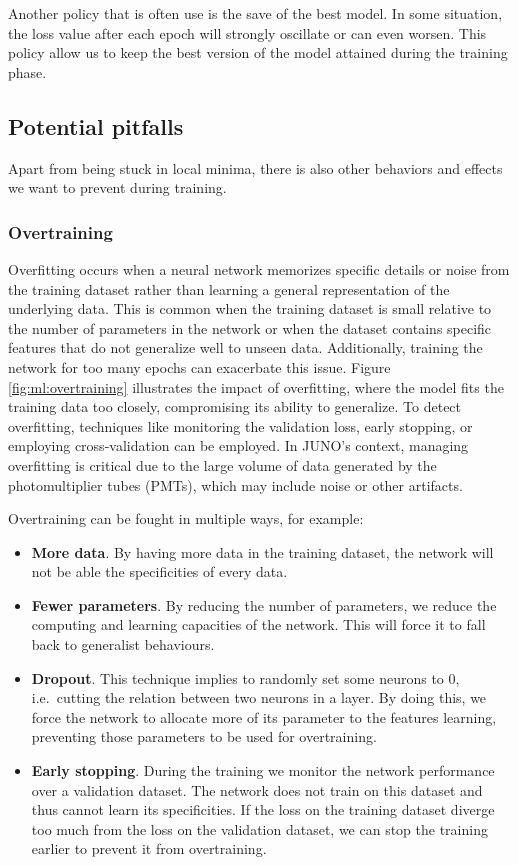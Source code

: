 \documentclass[../main.tex]{subfiles}
\begin{document}
Another policy that is often use is the save of the best model. In some situation, the loss value after each epoch will strongly oscillate or can even worsen. This policy allow us to keep the best version of the model attained during the training phase.

\subsection{Potential pitfalls}
\label{sec:ml:pitfall}

Apart from being stuck in local minima, there is also other behaviors and effects we want to prevent during training.

\subsubsection{Overtraining}

Overfitting occurs when a neural network memorizes specific details or noise from the training dataset rather than learning a general representation of the underlying data. This is common when the training dataset is small relative to the number of parameters in the network or when the dataset contains specific features that do not generalize well to unseen data. Additionally, training the network for too many epochs can exacerbate this issue. Figure \ref{fig:ml:overtraining} illustrates the impact of overfitting, where the model fits the training data too closely, compromising its ability to generalize.
To detect overfitting, techniques like monitoring the validation loss, early stopping, or employing cross-validation can be employed. In JUNO's context, managing overfitting is critical due to the large volume of data generated by the photomultiplier tubes (PMTs), which may include noise or other artifacts.

Overtraining can be fought in multiple ways, for example:
\begin{itemize}
  \item \textbf{More data}. By having more data in the training dataset, the network will not be able the specificities of every data.
  \item \textbf{Fewer parameters}. By reducing the number of parameters, we reduce the computing and learning capacities of the network. This will force it to fall back to generalist behaviours.
  \item \textbf{Dropout}. This technique implies to randomly set some neurons to 0, i.e.\ cutting the relation between two neurons in a layer. By doing this, we force the network to allocate more of its parameter to the features learning, preventing those parameters to be used for overtraining.
  \item \textbf{Early stopping}. During the training we monitor the network performance over a validation dataset. The network does not train on this dataset and thus cannot learn its specificities. If the loss on the training dataset diverge too much from the loss on the validation dataset, we can stop the training earlier to prevent it from overtraining.
\end{itemize}
\end{document}
